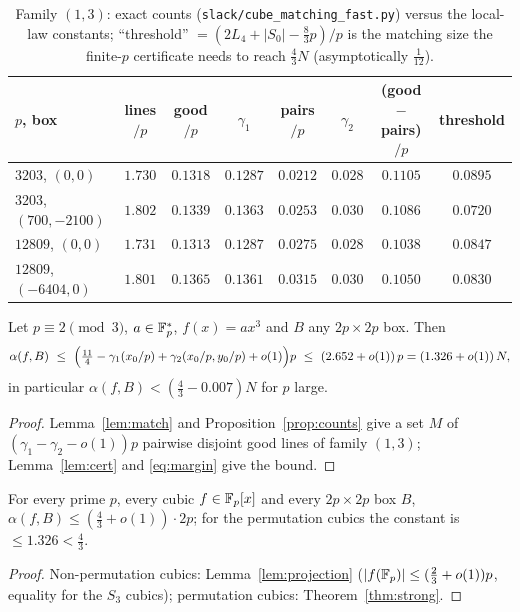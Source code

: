 \begin{table}[ht]\centering\scriptsize
\begin{tabular}{lccccccc}
\toprule
$p$, box & lines$/p$ & good$/p$ & $\gamma_1$ & pairs$/p$ & $\gamma_2$ & (good$-$pairs)$/p$ & threshold\\
\midrule
$3203$, $(0,0)$        & $1.730$ & $0.1318$ & $0.1287$ & $0.0212$ & $0.028$ & $0.1105$ & $0.0895$\\
$3203$, $(700,-2100)$  & $1.802$ & $0.1339$ & $0.1363$ & $0.0253$ & $0.030$ & $0.1086$ & $0.0720$\\
$12809$, $(0,0)$       & $1.731$ & $0.1313$ & $0.1287$ & $0.0275$ & $0.028$ & $0.1038$ & $0.0847$\\
$12809$, $(-6404,0)$   & $1.801$ & $0.1365$ & $0.1361$ & $0.0315$ & $0.030$ & $0.1050$ & $0.0830$\\
\bottomrule
\end{tabular}
\caption{Family $(1,3)$: exact counts (\texttt{slack/cube\_matching\_fast.py}) versus the local-law constants; ``threshold'' $=(2L_4+|S_0|-\tfrac83p)/p$ is
the matching size the finite-$p$ certificate needs to reach $\tfrac43N$ (asymptotically $\tfrac1{12}$).}\label{tab:strong}
\end{table}

\begin{theorem}\label{thm:strong}
Let $p\equiv2\pmod3$, $a\in\mathbb{F}_p^*$, $f(x)=ax^3$ and $B$ any $2p\times2p$ box.  Then
\[
 \alpha(f,B)\ \le\ \Bigl(\tfrac{11}4-\gamma_1(x_0/p)+\gamma_2(x_0/p,y_0/p)+o(1)\Bigr)p\ \le\ (2.652+o(1))\,p=(1.326+o(1))\,N,
\]
in particular $\alpha(f,B)<(\tfrac43-0.007)N$ for $p$ large.
\end{theorem}
\begin{proof}
Lemma~\ref{lem:match} and Proposition~\ref{prop:counts} give a set $M$ of $(\gamma_1-\gamma_2-o(1))p$ pairwise disjoint good lines of family $(1,3)$;
Lemma~\ref{lem:cert} and \eqref{eq:margin} give the bound.
\end{proof}

\begin{corollary}[Conjecture G3]\label{cor:g3}
For every prime $p$, every cubic $f\in\mathbb{F}_p[x]$ and every $2p\times2p$ box $B$, $\alpha(f,B)\le(\tfrac43+o(1))\cdot2p$; for the permutation cubics the
constant is $\le1.326<\tfrac43$.
\end{corollary}
\begin{proof}
Non-permutation cubics: Lemma~\ref{lem:projection} ($|f(\mathbb{F}_p)|\le(\tfrac23+o(1))p$, equality for the $S_3$ cubics); permutation cubics: Theorem~\ref{thm:strong}.
\end{proof}

